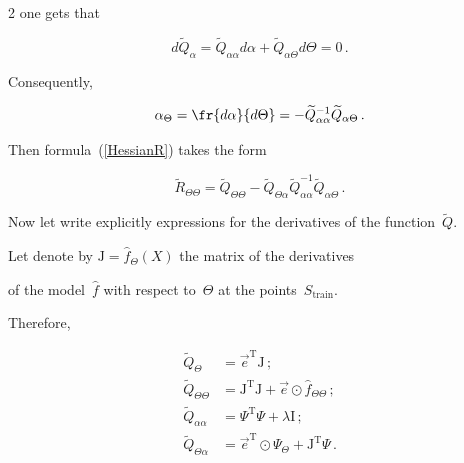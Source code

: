 \begin{multicols}{2}
one gets that

\begin{equation*}

    d{\widetilde Q}_\alpha = \widetilde Q_{\alpha \alpha}d\alpha  + 

    \widetilde Q_{\alpha \Theta}d\Theta  = 0\,.

\end{equation*}

Consequently,

$$

    \alpha_\Theta = \fr{d\alpha}{d\Theta} = - 

    \widetilde Q_{\alpha \alpha}^{-1} \widetilde Q_{\alpha \Theta}\,.

$$

Then formula~(\ref{HessianR}) takes the form

  $$

  \widetilde R_{\Theta\Theta} =  \widetilde Q_{\Theta\Theta} - \widetilde Q_{\Theta\alpha} \widetilde Q_{\alpha \alpha}^{-1} \widetilde Q_{\alpha \Theta}\,.

  $$



Now let write explicitly expressions for the derivatives of the function~$\widetilde Q$.

Let denote by $\mathrm{J} = {\hat f_\Theta(X)}$ the matrix of the derivatives 

of the model~$\hat f$ with respect to~$\Theta$ at the points~$S_{\mathrm{train}}$.

Therefore,

  \begin{equation}

    \left.

    \begin{array}{rl}

    \widetilde Q_{\Theta} &= {\vec e}^{\mathrm{T}} \mathrm{J}\,; \\[9pt]

    \widetilde Q_{\Theta \Theta} &= \mathrm{J}^{\mathrm{T}}\mathrm{J} + 

    \vec e \odot {\hat f_{\Theta \Theta}}\,; \\[9pt]

    \widetilde Q_{\alpha \alpha} &= \Psi^{\mathrm{T}} \Psi + \lambda \mathrm{I}\,;\\[9pt]

    \widetilde Q_{\Theta\alpha} &= {\vec e}^{\mathrm{T}} \odot \Psi_\Theta + 

    \mathrm{J}^{\mathrm{T}}  \Psi\,.


\end{array}
\end{equation}
\end{multicols}
